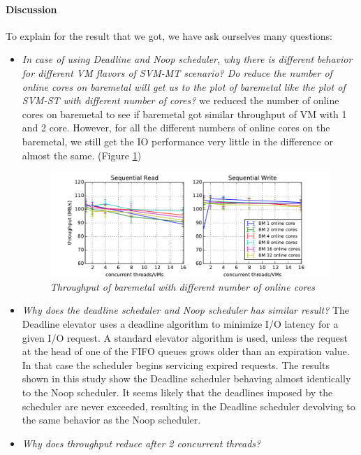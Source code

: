 \documentclass{acmsig}
\begin{document}
\paragraph{Discussion}
To explain for the result that we got, we have ask ourselves many questions:
\begin{itemize}
 \item \textit{In case of using Deadline and Noop scheduler, why there is different behavior for different VM flavors of SVM-MT scenario? Do reduce the number of online cores on baremetal will get us to the plot of baremetal like the plot of SVM-ST with different number of cores?} we reduced the number of online cores on baremetal to see if baremetal got similar throughput of VM with 1 and 2 core. However, for all the different numbers of online cores on the baremetal, we still get the IO performance very little in the difference or almost the same. (Figure \ref{fig:throughputbmdiffonlinecore})
     \begin{figure}[t]
      \centering
      \includegraphics[scale=0.7]{figures/throughput_cfq_bmdiffonlinecore.pdf}
      \caption{\textit{Throughput of baremetal with different number of online cores}}
      \label{fig:throughputbmdiffonlinecore}
     \end{figure}
 \item \textit{Why does the deadline scheduler and Noop scheduler has similar result?} The Deadline elevator uses a deadline algorithm to minimize I/O latency for a given I/O request. A standard elevator algorithm is used, unless the request at the head of one of the FIFO queues grows older than an expiration value. In that case the scheduler begins servicing expired requests. The results shown in this study show the Deadline scheduler behaving almost identically to the Noop scheduler. It seems likely that the deadlines imposed by the scheduler are never exceeded, resulting in the Deadline scheduler devolving to the same behavior as the Noop scheduler.
 \item \textit{Why does throughput reduce after 2 concurrent threads?}

\end{itemize}
\end{document}
